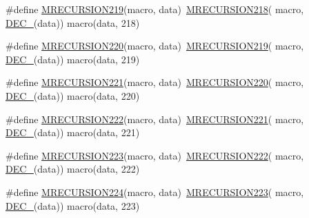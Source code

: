 \begin{DoxyCompactItemize}
\item 
\#define \mbox{\hyperlink{group__group__sam0__utils__mrecursion_ga2a11a726d4daa1ad0ef13baafa4a12c1}{M\+R\+E\+C\+U\+R\+S\+I\+O\+N219}}(macro,  data)~\mbox{\hyperlink{group__group__sam0__utils__mrecursion_ga0cd77c09c29f7703306e2baa29d6e6c2}{M\+R\+E\+C\+U\+R\+S\+I\+O\+N218}}(  macro, \mbox{\hyperlink{group__group__sam0__utils__mrecursion_ga1d23d683797679dca8c3512a54a5dcae}{D\+E\+C\+\_\+}}(data))   macro(data, 218)
\item 
\#define \mbox{\hyperlink{group__group__sam0__utils__mrecursion_gaf25d86aca809a1c7161e431090a6d7a2}{M\+R\+E\+C\+U\+R\+S\+I\+O\+N220}}(macro,  data)~\mbox{\hyperlink{group__group__sam0__utils__mrecursion_ga2a11a726d4daa1ad0ef13baafa4a12c1}{M\+R\+E\+C\+U\+R\+S\+I\+O\+N219}}(  macro, \mbox{\hyperlink{group__group__sam0__utils__mrecursion_ga1d23d683797679dca8c3512a54a5dcae}{D\+E\+C\+\_\+}}(data))   macro(data, 219)
\item 
\#define \mbox{\hyperlink{group__group__sam0__utils__mrecursion_gab39c3f39c867806b04c6e4b5afe65fb8}{M\+R\+E\+C\+U\+R\+S\+I\+O\+N221}}(macro,  data)~\mbox{\hyperlink{group__group__sam0__utils__mrecursion_gaf25d86aca809a1c7161e431090a6d7a2}{M\+R\+E\+C\+U\+R\+S\+I\+O\+N220}}(  macro, \mbox{\hyperlink{group__group__sam0__utils__mrecursion_ga1d23d683797679dca8c3512a54a5dcae}{D\+E\+C\+\_\+}}(data))   macro(data, 220)
\item 
\#define \mbox{\hyperlink{group__group__sam0__utils__mrecursion_gaa0d5577f93a6d507f684b144d77d3ada}{M\+R\+E\+C\+U\+R\+S\+I\+O\+N222}}(macro,  data)~\mbox{\hyperlink{group__group__sam0__utils__mrecursion_gab39c3f39c867806b04c6e4b5afe65fb8}{M\+R\+E\+C\+U\+R\+S\+I\+O\+N221}}(  macro, \mbox{\hyperlink{group__group__sam0__utils__mrecursion_ga1d23d683797679dca8c3512a54a5dcae}{D\+E\+C\+\_\+}}(data))   macro(data, 221)
\item 
\#define \mbox{\hyperlink{group__group__sam0__utils__mrecursion_ga0ea3f60a2517a10616b7a00e57722636}{M\+R\+E\+C\+U\+R\+S\+I\+O\+N223}}(macro,  data)~\mbox{\hyperlink{group__group__sam0__utils__mrecursion_gaa0d5577f93a6d507f684b144d77d3ada}{M\+R\+E\+C\+U\+R\+S\+I\+O\+N222}}(  macro, \mbox{\hyperlink{group__group__sam0__utils__mrecursion_ga1d23d683797679dca8c3512a54a5dcae}{D\+E\+C\+\_\+}}(data))   macro(data, 222)
\item 
\#define \mbox{\hyperlink{group__group__sam0__utils__mrecursion_ga5d2b86c40ce9218629a8c46d94f34206}{M\+R\+E\+C\+U\+R\+S\+I\+O\+N224}}(macro,  data)~\mbox{\hyperlink{group__group__sam0__utils__mrecursion_ga0ea3f60a2517a10616b7a00e57722636}{M\+R\+E\+C\+U\+R\+S\+I\+O\+N223}}(  macro, \mbox{\hyperlink{group__group__sam0__utils__mrecursion_ga1d23d683797679dca8c3512a54a5dcae}{D\+E\+C\+\_\+}}(data))   macro(data, 223)

\end{DoxyCompactItemize}
